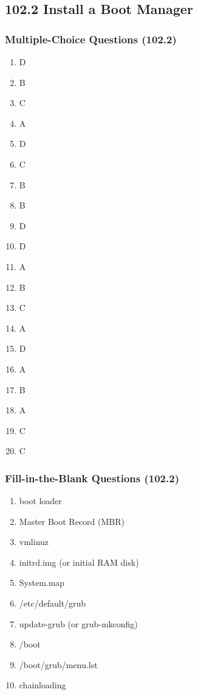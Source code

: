 \documentclass[a4paper]{report}
\begin{document}
\subsection*{102.2 Install a Boot Manager}
\subsubsection*{Multiple-Choice Questions (102.2)}
\begin{enumerate}[1.]
    \item D
    \item B
    \item C
    \item A
    \item D
    \item C
    \item B
    \item B
    \item D
    \item D
    \item A
    \item B
    \item C
    \item A
    \item D
    \item A
    \item B
    \item A
    \item C
    \item C
\end{enumerate}


\subsubsection*{Fill-in-the-Blank Questions (102.2)}
\begin{enumerate}[1.]
    \item boot loader
    \item Master Boot Record (MBR)
    \item vmlinuz
    \item initrd.img (or initial RAM disk)
    \item System.map
    \item /etc/default/grub
    \item update-grub (or grub-mkconfig)
    \item /boot
    \item /boot/grub/menu.lst
    \item chainloading
\end{enumerate}
\end{document}
